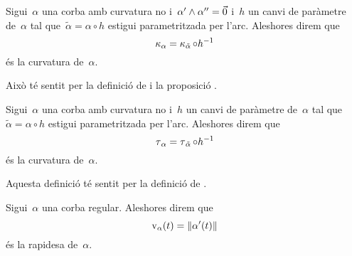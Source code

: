 \documentclass[../../main.tex]{subfiles}
\begin{document}
    \begin{definition}
        \label{def:curvatura  per una reparametrització}
        Sigui~\(\alpha\) una corba amb curvatura no \nulla{} i~\(\alpha'\mathbin{\wedge}\alpha''=\vec{0}\) i~\(h\) un canvi de paràmetre de~\(\alpha\) tal que~\(\tilde{\alpha}=\alpha\circ h\) estigui parametritzada per l'arc.
        Aleshores direm que
        \[
            \operatorname{\kappa}_{\alpha}=\operatorname{\kappa}_{\tilde{\alpha}}\circ h^{-1}
        \]
        és la curvatura de~\(\alpha\).

        Això té sentit per la definició de  i la proposició .
    \end{definition}
    \begin{definition}
        \label{def:torsió  per una reparametrització}
        Sigui~\(\alpha\) una corba amb curvatura no \nulla{} i~\(h\) un canvi de paràmetre de~\(\alpha\) tal que~\(\tilde{\alpha}=\alpha\circ h\) estigui parametritzada per l'arc.
        Aleshores direm que
        \[
            \operatorname{\tau}_{\alpha}=\operatorname{\tau}_{\tilde{\alpha}}\circ h^{-1}
        \]
        és la curvatura de~\(\alpha\).

        Aquesta definició té sentit per la definició de .
    \end{definition}
    \begin{definition}[Rapidesa]
        \label{def:rapidesa}
        Sigui~\(\alpha\) una corba regular.
        Aleshores direm que
        \[
            \rapidesa_{\alpha}(t)=\norm{\alpha'(t)}
        \]
        és la rapidesa de~\(\alpha\).
    \end{definition}
\end{document}
